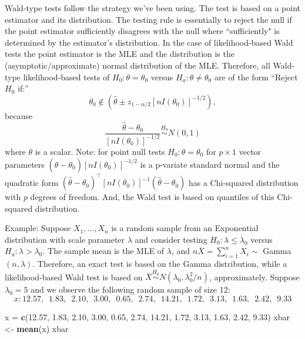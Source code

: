 \documentclass[]{book}
\newenvironment{Shaded}{\begin{snugshade}}{\end{snugshade}}
\newcommand{\KeywordTok}[1]{\textcolor[rgb]{0.13,0.29,0.53}{\textbf{{#1}}}}
\newcommand{\FloatTok}[1]{\textcolor[rgb]{0.00,0.00,0.81}{{#1}}}
\newcommand{\StringTok}[1]{\textcolor[rgb]{0.31,0.60,0.02}{{#1}}}
\newcommand{\NormalTok}[1]{{#1}}
\begin{document}
Wald-type tests follow the strategy we've been using. The test is based
on a point estimator and its distribution. The testing rule is
essentially to reject the null if the point estimator sufficiently
disagrees with the null where ``sufficiently" is determined by the
estimator's distribution. In the case of likelihood-based Wald tests the
point estimator is the MLE and the distribution is the
(asymptotic/approximate) normal distribution of the MLE. Therefore, all
Wald-type likelihood-based tests of \(H_0:\theta = \theta_0\) versus
\(H_a:\theta\ne \theta_0\) are of the form ``Reject \(H_0\) if:''
\[\theta_0 \notin (\hat\theta \pm z_{1-\alpha/2}[nI(\theta_0)]^{-1/2}),\]
because
\[\frac{\hat\theta - \theta_0}{[nI(\theta_0)]^{-1/2}}\stackrel{H_0}{\sim}N(0,1)\]
where \(\theta\) is a scalar. Note: for point null tests
\(H_0:\theta=\theta_0\) for \(p\times 1\) vector parameters
\((\hat\theta-\theta_0)[nI(\theta_0)]^{-1/2}\) is a p-variate standard
normal and the quadratic form
\((\hat\theta-\theta_0)^{\top}[nI(\theta_0)]^{-1} (\hat\theta-\theta_0)\)
has a Chi-squared distribution with \(p\) degrees of freedom. And, the
Wald test is based on quantiles of this Chi-squared distribution.

 Example: Suppose \(X_1, \ldots, X_n\) is a random sample from an
Exponential distribution with scale parameter \(\lambda\) and consider
testing \(H_0:\lambda \leq \lambda_0\) versus
\(H_a:\lambda > \lambda_0\). The sample mean is the MLE of \(\lambda\),
and \(n\overline X= \sum_{i=1}^nX_i \sim\) Gamma\((n, \lambda)\).
Therefore, an exact test is based on the Gamma distribution, while a
likelihood-based Wald test is based on
\(\overline X \stackrel{H_0}{\sim}N(\lambda_0,\lambda_0^2/n)\),
approximately. Suppose \(\lambda_0 = 5\) and we observe the following
random sample of size 12:
\[x : 12.57,\,\,\,  1.83,\,\,\,  2.10,\,\,\,  3.00,\,\,\,  0.65,\,\,\,  2.74,\,\,\, 14.21,\,\,\,  1.72,\,\,\,  3.13,\,\,\,  1.63,\,\,\,  2.42,\,\,\,  9.33\]

\begin{Shaded}
\begin{Highlighting}[]
\NormalTok{x =}\StringTok{ }\KeywordTok{c}\NormalTok{(}\FloatTok{12.57}\NormalTok{,  }\FloatTok{1.83}\NormalTok{,  }\FloatTok{2.10}\NormalTok{,  }\FloatTok{3.00}\NormalTok{,  }\FloatTok{0.65}\NormalTok{,  }\FloatTok{2.74}\NormalTok{, }\FloatTok{14.21}\NormalTok{,  }\FloatTok{1.72}\NormalTok{,  }\FloatTok{3.13}\NormalTok{,  }\FloatTok{1.63}\NormalTok{,  }\FloatTok{2.42}\NormalTok{,  }\FloatTok{9.33}\NormalTok{)}
\NormalTok{xbar <-}\StringTok{ }\KeywordTok{mean}\NormalTok{(x)}
\NormalTok{xbar}
\end{Highlighting}
\end{Shaded}
\end{document}
